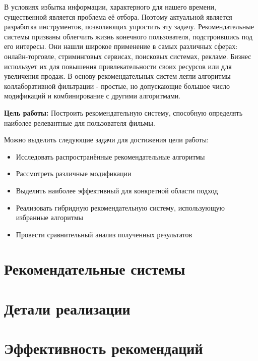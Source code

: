 \documentclass[a4paper,article,14pt]{extarticle}
\begin{document}


\tableofcontents
\pagebreak


В условиях избытка информации, характерного для нашего времени, существенной является проблема её отбора.
Поэтому актуальной является разработка инструментов, позволяющих упростить эту задачу.
Рекомендательные системы призваны облегчить жизнь конечного пользователя, подстроившись под его интересы.
Они нашли широкое применение в самых различных сферах: онлайн-торговле, стриминговых сервисах, поисковых системах, рекламе.
Бизнес использует их для повышения привлекательности своих ресурсов или для увеличения продаж.
В основу рекомендательных систем легли алгоритмы коллаборативной фильтрации - простые, но допускающие большое число модификаций и комбинирование с другими алгоритмами.


\textbf{Цель работы:} Построить рекомендательную систему, способную определять наиболее релевантные для пользователя фильмы.

Можно выделить следующие задачи для достижения цели работы:
\begin{itemize}
\item Исследовать распространённые рекомендательные алгоритмы
\item Рассмотреть различные модификации
\item Выделить наиболее эффективный для конкретной области подход
\item Реализовать гибридную рекомендательную систему, использующую избранные алгоритмы
\item Провести сравнительный анализ полученных результатов
\end{itemize}

\pagebreak
\section{Рекомендательные системы}\label{sec:recommender_systems}


\pagebreak
\section{Детали реализации}\label{sec:program_realization}


\pagebreak
\section{Эффективность рекомендаций}\label{sec:algos_efficiency}

\end{document}
